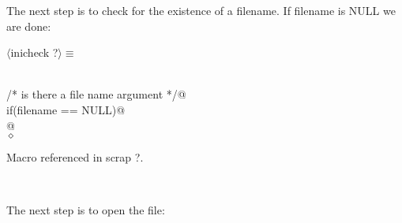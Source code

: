 \documentclass[12pt]{article}
\begin{document}
The next step is to check for the existence of a filename. If filename is
NULL we are done:
\begin{flushleft} \small
\begin{minipage}{\linewidth} \label{scrap7}
$\langle$inicheck {\footnotesize ?}$\rangle\equiv$
\vspace{-1ex}
\begin{list}{}{} \item
\mbox{}\verb@@\\
\mbox{}\verb@     /* is there a file name argument */@\\
\mbox{}\verb@     if(filename == NULL)@\\
\mbox{}@\\
\mbox{}\verb@@$\diamond$
\end{list}
\vspace{-1ex}
\footnotesize\addtolength{\baselineskip}{-1ex}
\begin{list}{}{\setlength{\itemsep}{-\parsep}\setlength{\itemindent}{-\leftmargin}}
\item Macro referenced in scrap ?.
\end{list}
\end{minipage}\\[4ex]
\end{flushleft}
The next step is to open the file:
\end{document}
